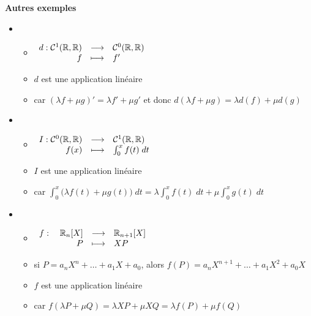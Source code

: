 \begin{frame}
\hfill{\textbf{Autres exemples}}

\vspace*{-0.5ex}
\begin{itemize}
  \item {}
  \begin{itemize}\setlength{\itemsep}{3pt}
    \item $\begin{array}{rcl}
d : \mathcal{C}^1 (\mathbb{R},\mathbb{R}) & \longrightarrow & \mathcal{C}^0 (\mathbb{R},\mathbb{R})  \\
f & \longmapsto & f'     
  \end{array}$
    \item $d$ est une application linéaire
    \item car $(\lambda f + \mu g)' = \lambda f' + \mu g'$ et donc $d(\lambda f + \mu g)=\lambda d(f) + \mu d(g)$
  \end{itemize}
  
\medskip
\pause

  \item {}
  \begin{itemize}\setlength{\itemsep}{3pt}
    \item $\begin{array}{rcl}
  I : \mathcal{C}^0(\mathbb{R},\mathbb{R}) & \longrightarrow & \mathcal{C}^1(\mathbb{R},\mathbb{R})\\  
  f(x) & \longmapsto & \int_0^x f(t) \; dt
  \end{array}$
    \item $I$ est une application linéaire
    \item car $\int_0^x \big(\lambda f(t) + \mu g(t)\big) \; dt = \lambda \int_0^x f(t) \; dt + \mu \int_0^x g(t) \; dt$
  \end{itemize}
  
\medskip
\pause

  \item {}
  \begin{itemize}\setlength{\itemsep}{3pt}
    \item $\begin{array}{rcl}
f : \quad \mathbb{R}_n[X]  & \longrightarrow & \mathbb{R}_{n+1}[X] \\
P & \longmapsto & X P
  \end{array}$
    \item si $P = a_n X^n + \dots + a_1 X + a_0$,
alors $f(P) =  a_n X^{n+1} + \dots + a_1 X^2 + a_0 X$
    \item $f$ est une application linéaire
    \item car $f(\lambda P+ \mu Q) = \lambda X P + \mu X Q = \lambda f(P) + \mu f(Q)$
  \end{itemize}
\end{itemize}
\end{frame}


